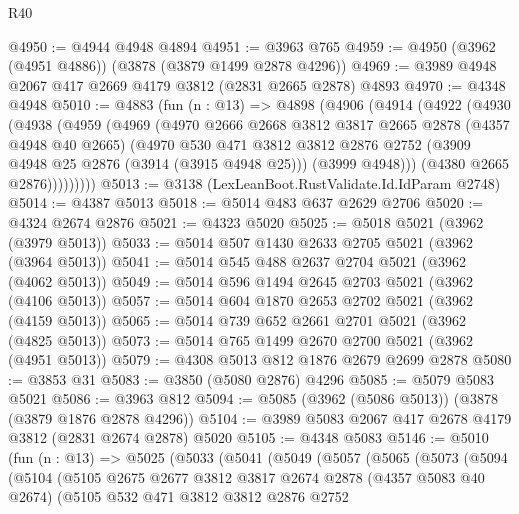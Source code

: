\begin{lexlean}{R40}
\begin{coremodule}
@4950 := @4944 @4948 @4894
@4951 := @3963 @765
@4959 := @4950 (@3962 (@4951 @4886)) (@3878 (@3879 @1499 @2878 @4296))
@4969 := @3989 @4948 @2067 @417 @2669 @4179 @3812 (@2831 @2665 @2878) @4893
@4970 := @4348 @4948
@5010 := @4883
    (fun (n : @13) =>
    @4898
      (@4906
        (@4914
          (@4922
            (@4930
              (@4938
                (@4959
                  (@4969
                    (@4970
                      @2666
                      @2668
                      @3812
                      @3817
                      @2665
                      @2878
                      (@4357 @4948 @40 @2665)
                      (@4970
                        @530
                        @471
                        @3812
                        @3812
                        @2876
                        @2752
                        (@3909 @4948 @25 @2876 (@3914 (@3915 @4948 @25)))
                        (@3999 @4948)))
                    (@4380 @2665 @2876)))))))))
@5013 := @3138 (LexLeanBoot.RustValidate.Id.IdParam @2748)
@5014 := @4387 @5013
@5018 := @5014 @483 @637 @2629 @2706
@5020 := @4324 @2674 @2876
@5021 := @4323 @5020
@5025 := @5018 @5021 (@3962 (@3979 @5013))
@5033 := @5014 @507 @1430 @2633 @2705 @5021 (@3962 (@3964 @5013))
@5041 := @5014 @545 @488 @2637 @2704 @5021 (@3962 (@4062 @5013))
@5049 := @5014 @596 @1494 @2645 @2703 @5021 (@3962 (@4106 @5013))
@5057 := @5014 @604 @1870 @2653 @2702 @5021 (@3962 (@4159 @5013))
@5065 := @5014 @739 @652 @2661 @2701 @5021 (@3962 (@4825 @5013))
@5073 := @5014 @765 @1499 @2670 @2700 @5021 (@3962 (@4951 @5013))
@5079 := @4308 @5013 @812 @1876 @2679 @2699 @2878
@5080 := @3853 @31
@5083 := @3850 (@5080 @2876) @4296
@5085 := @5079 @5083 @5021
@5086 := @3963 @812
@5094 := @5085 (@3962 (@5086 @5013)) (@3878 (@3879 @1876 @2878 @4296))
@5104 := @3989 @5083 @2067 @417 @2678 @4179 @3812 (@2831 @2674 @2878) @5020
@5105 := @4348 @5083
@5146 := @5010
    (fun (n : @13) =>
    @5025
      (@5033
        (@5041
          (@5049
            (@5057
              (@5065
                (@5073
                  (@5094
                    (@5104
                      (@5105
                        @2675
                        @2677
                        @3812
                        @3817
                        @2674
                        @2878
                        (@4357 @5083 @40 @2674)
                        (@5105
                          @532
                          @471
                          @3812
                          @3812
                          @2876
                          @2752

\end{coremodule}
\end{lexlean}
